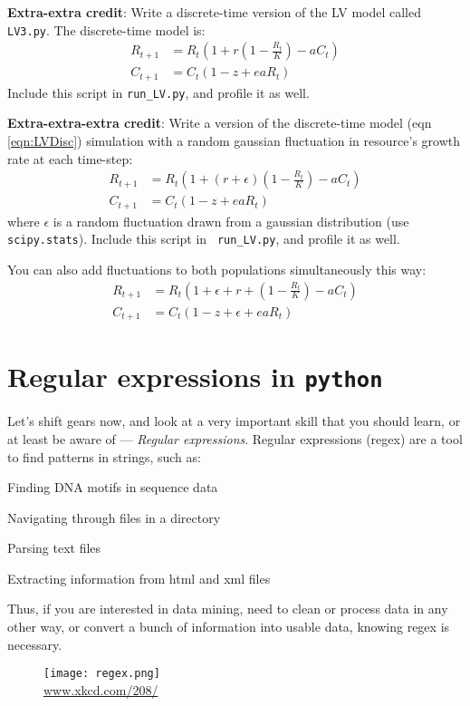 {\bf Extra-extra credit}: Write a discrete-time version of the LV 
model called {\tt LV3.py}. The discrete-time model is: 
\begin{equation}\label{eqn:LVDisc} 
	\begin{aligned} 
		R_{t+1} &= R_t (1 + r (1 - \frac{R_t}{K}) - a C_t)\\ 
		C_{t+1} &= C_t (1 - z + e a R_t) 
	\end{aligned} 
\end{equation}
Include this script in {\tt run\_LV.py}, and profile it as well. 

{\bf Extra-extra-extra credit}: Write a version of the discrete-time 
model (eqn \ref{eqn:LVDisc}) simulation with a random gaussian 
fluctuation in resource's growth rate at each time-step: 
\begin{equation}\label{eqn:LVFluc1}
	\begin{aligned}
		R_{t+1} &= R_t (1 + (r + \epsilon) (1 - \frac{R_t}{K})- a C_t)\\
		C_{t+1} &= C_t (1 - z + e a R_t)
	\end{aligned}
\end{equation}
where $\epsilon$ is a random fluctuation drawn from a gaussian 
distribution (use {\tt scipy.stats}). Include this script in {\tt 
run\_LV.py}, and profile it as well. 

You can also add fluctuations to both populations simultaneously this way: 
\begin{equation}\label{eqn:LVFluc2}
	\begin{aligned}
		R_{t+1} &= R_t (1 + \epsilon + r +  (1 - \frac{R_t}{K}) - a C_t)\\
		C_{t+1} &= C_t (1 - z + \epsilon + e a R_t)
	\end{aligned} 
\end{equation}

\section{Regular expressions in {\tt python}}

Let's shift gears now, and look at a very important skill that you 
should learn, or at least be aware of --- {\it Regular expressions}. 
Regular expressions (regex) are a tool to find patterns in strings, 
such as:
\begin{compactitem}
	\item Finding DNA motifs in sequence data
	\item Navigating through files in a directory
	\item Parsing text files
	\item Extracting information from html and xml files
\end{compactitem}
Thus, if you are interested in data mining, need to clean or process 
data in any other way, or convert a bunch of information into usable 
data, knowing regex is necessary. 
\begin{figure}[H] \centering
	\texttt{[image: regex.png]}\\
	\url{www.xkcd.com/208/}
\end{figure}


